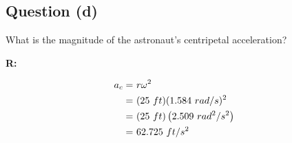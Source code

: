 	\subsection{Question (d)}

		What is the magnitude of the astronaut's centripetal acceleration?

		\textbf{R:}

		\begin{align}
			a_{c} = \ &r \omega^{2}& \notag \\
			= \ &(25 \ ft)(1.584 \ rad/s)^{2}& \notag \\
			= \ &(25 \ ft)\left(2.509 \ rad^{2}/s^{2}\right)& \notag \\
			= \ &62.725 \ ft/s^{2}&
		\end{align}
